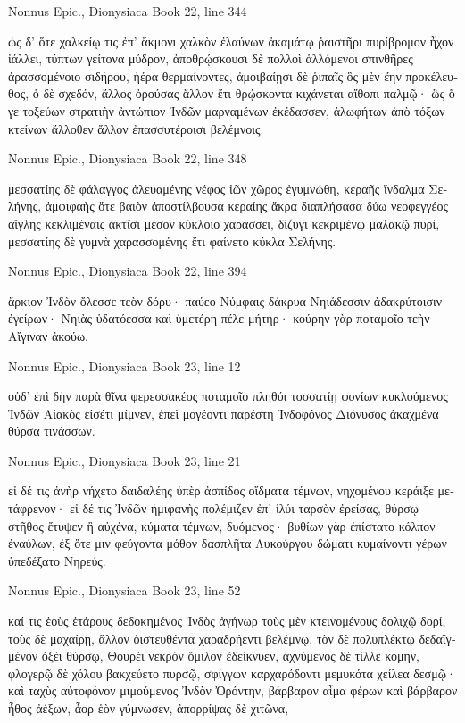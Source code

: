 \documentclass[12pt,letterpaper,twoside,final]{memoir}
\begin{document}
\begin{greek}
Nonnus Epic., Dionysiaca 
Book 22, line 344

ὡς δ' ὅτε χαλκείῳ τις ἐπ' ἄκμονι χαλκὸν ἐλαύνων 
ἀκαμάτῳ ῥαιστῆρι πυρίβρομον ἦχον ἰάλλει, 
τύπτων γείτονα μύδρον, ἀποθρῴσκουσι δὲ πολλοὶ 
ἁλλόμενοι σπινθῆρες ἀρασσομένοιο σιδήρου, 
ἠέρα θερμαίνοντες, ἀμοιβαίῃσι δὲ ῥιπαῖς 
ὃς μὲν ἔην προκέλευθος, ὁ δὲ σχεδόν, ἄλλος ὀρούσας 
ἄλλον ἔτι θρῴσκοντα κιχάνεται αἴθοπι παλμῷ· 
ὣς ὅ γε τοξεύων στρατιὴν ἀντώπιον Ἰνδῶν 
μαρναμένων ἐκέδασσεν, ἀλωφήτων ἀπὸ τόξων 
κτείνων ἄλλοθεν ἄλλον ἐπασσυτέροισι βελέμνοις. 



Nonnus Epic., Dionysiaca 
Book 22, line 348

μεσσατίης δὲ φάλαγγος ἀλευαμένης νέφος ἰῶν 
χῶρος ἐγυμνώθη, κεραῆς ἴνδαλμα Σελήνης,   
ἀμφιφαὴς ὅτε βαιὸν ἀποστίλβουσα κεραίης 
ἄκρα διαπλήσασα δύω νεοφεγγέος αἴγλης 
κεκλιμέναις ἀκτῖσι μέσον κύκλοιο χαράσσει, 
δίζυγι κεκριμένῳ μαλακῷ πυρί, μεσσατίης δὲ 
γυμνὰ χαρασσομένης ἔτι φαίνετο κύκλα Σελήνης. 



Nonnus Epic., Dionysiaca 
Book 22, line 394

ἄρκιον Ἰνδὸν ὄλεσσε τεὸν δόρυ· παύεο Νύμφαις 
δάκρυα Νηιάδεσσιν ἀδακρύτοισιν ἐγείρων· 
Νηιὰς ὑδατόεσσα καὶ ὑμετέρη πέλε μήτηρ· 
κούρην γὰρ ποταμοῖο τεὴν Αἴγιναν ἀκούω. 



Nonnus Epic., Dionysiaca 
Book 23, line 12

οὐδ' ἐπὶ δὴν παρὰ θῖνα φερεσσακέος ποταμοῖο 
πληθύι τοσσατίῃ φονίων κυκλούμενος Ἰνδῶν 
Αἰακὸς εἰσέτι μίμνεν, ἐπεὶ μογέοντι παρέστη 
Ἰνδοφόνος Διόνυσος ἀκαχμένα θύρσα τινάσσων. 



Nonnus Epic., Dionysiaca 
Book 23, line 21

                                         εἰ δέ τις ἀνὴρ 
νήχετο δαιδαλέης ὑπὲρ ἀσπίδος οἴδματα τέμνων, 
νηχομένου κεράιξε μετάφρενον· εἰ δέ τις Ἰνδῶν 
ἡμιφανὴς πολέμιζεν ἐπ' ἰλύι ταρσὸν ἐρείσας, 
θύρσῳ στῆθος ἔτυψεν ἢ αὐχένα, κύματα τέμνων, 
δυόμενος· βυθίων γὰρ ἐπίστατο κόλπον ἐναύλων, 
ἐξ ὅτε μιν φεύγοντα μόθον δασπλῆτα Λυκούργου 
δώματι κυμαίνοντι γέρων ὑπεδέξατο Νηρεύς. 



Nonnus Epic., Dionysiaca 
Book 23, line 52

καί τις ἑοὺς ἑτάρους δεδοκημένος Ἰνδὸς ἀγήνωρ 
τοὺς μὲν κτεινομένους δολιχῷ δορί, τοὺς δὲ μαχαίρῃ, 
ἄλλον ὀιστευθέντα χαραδρήεντι βελέμνῳ, 
τὸν δὲ πολυπλέκτῳ δεδαϊγμένον ὀξέι θύρσῳ, 
Θουρέι νεκρὸν ὅμιλον ἐδείκνυεν, ἀχνύμενος δὲ 
τίλλε κόμην, φλογερῷ δὲ χόλου βακχεύετο πυρσῷ, 
σφίγγων καρχαρόδοντι μεμυκότα χείλεα δεσμῷ· 
καὶ ταχὺς αὐτοφόνον μιμούμενος Ἰνδὸν Ὀρόντην, 
βάρβαρον αἷμα φέρων καὶ βάρβαρον ἦθος ἀέξων, 
ἆορ ἑὸν γύμνωσεν, ἀπορρίψας δὲ χιτῶνα,   





\end{greek}
\end{document}
